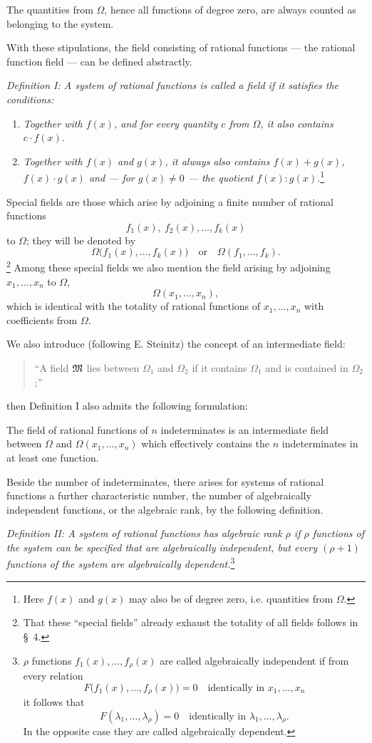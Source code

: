 \documentclass[11pt]{article}
\begin{document}
The quantities from $\Omega$, hence all functions of degree zero, are always counted as belonging to the system.

With these stipulations, the field consisting of rational functions --- the rational function field --- can be defined abstractly.

\emph{Definition I: A system of rational functions is called a field if it satisfies the conditions:}
\begin{enumerate}
\item \emph{Together with $f(x)$, and for every quantity $c$ from $\Omega$, it also contains $c\cdot f(x)$.}
\item \emph{Together with $f(x)$ and $g(x)$, it always also contains $f(x)+g(x)$, $f(x)\cdot g(x)$ and --- for $g(x)\ne0$ --- the quotient $f(x):g(x)$.}\footnote{Here $f(x)$ and $g(x)$ may also be of degree zero, i.e. quantities from $\Omega$.}
\end{enumerate}
Special fields are those which arise by adjoining a finite number of rational functions
\[
  f_1(x),\ f_2(x),\ldots, f_k(x)
\]
to $\Omega$; they will be denoted by
\[
  \Omega\bigl(f_1(x),\ldots,f_k(x)\bigr)
  \quad\text{or}\quad
  \Omega(f_1,\ldots,f_k).
\]
\footnote{That these ``special fields'' already exhaust the totality of all fields follows in \S\ 4.}
Among these special fields we also mention the field arising by adjoining $x_1,\ldots,x_n$ to $\Omega$,
\[
  \Omega(x_1,\ldots,x_n),
\]
which is identical with the totality of rational functions of $x_1,\ldots,x_n$ with coefficients from $\Omega$.

We also introduce (following E. Steinitz) the concept of an intermediate field:
\begin{quote}
``A field $\mathfrak{M}$ lies between $\Omega_1$ and $\Omega_2$ if it contains $\Omega_1$ and is contained in $\Omega_2$;''
\end{quote}
then Definition I also admits the following formulation:

The field of rational functions of $n$ indeterminates is an intermediate field between $\Omega$ and $\Omega(x_1,\ldots,x_n)$ which effectively contains the $n$ indeterminates in at least one function.

Beside the number of indeterminates, there arises for systems of rational functions a further characteristic number, the number of algebraically independent functions, or the algebraic rank, by the following definition.

\emph{Definition II: A system of rational functions has algebraic rank $\rho$ if $\rho$ functions of the system can be specified that are algebraically independent, but every $(\rho+1)$ functions of the system are algebraically dependent.}\footnote{$\rho$ functions $f_1(x),\ldots,f_\rho(x)$ are called algebraically independent if from every relation
\[
F\bigl(f_1(x),\ldots,f_\rho(x)\bigr)=0\quad\text{identically in }x_1,\ldots,x_n
\]
it follows that
\[
F(\lambda_1,\ldots,\lambda_\rho)=0\quad\text{identically in }\lambda_1,\ldots,\lambda_\rho.
\]
In the opposite case they are called algebraically dependent.}
\end{document}
